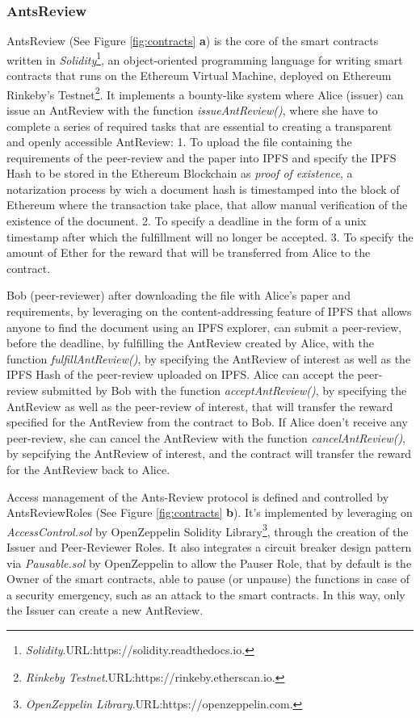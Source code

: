 \documentclass[runningheads]{llncs}
\begin{document}
\subsubsection{AntsReview}
AntsReview (See Figure \ref{fig:contracts} \textbf{a}) is the core of the smart contracts written in \emph{Solidity}\footnote[6]{\emph{Solidity}.\textsc{URL:}https://solidity.readthedocs.io.}, an object-oriented programming language for writing smart contracts that runs on the Ethereum Virtual Machine, deployed on Ethereum Rinkeby's Testnet\footnote[7]{\emph{Rinkeby Testnet}.\textsc{URL:}https://rinkeby.etherscan.io.}. It implements a bounty-like system where Alice (issuer) can issue an AntReview with the function \emph{issueAntReview()}, where she have to complete a series of required tasks that are essential to creating a transparent and openly accessible AntReview:
 1. To upload the file containing the requirements of the peer-review and the paper into IPFS\cite{IPFS} and specify the IPFS Hash to be stored in the Ethereum Blockchain as \emph{proof of existence}, a notarization process by wich a document hash is timestamped into the block of Ethereum where the transaction take place, that allow manual verification of the existence of the document.
 2. To specify a deadline in the form of a unix timestamp after which the fulfillment will no longer be accepted.
 3. To specify the amount of Ether for the reward that will be transferred from Alice to the contract.

Bob (peer-reviewer) after downloading the file with Alice's paper and requirements, by leveraging on the content-addressing feature of IPFS that allows anyone to find the document using an IPFS explorer, can submit a peer-review, before the deadline, by fulfilling the AntReview created by Alice, with the function \emph{fulfillAntReview()}, by specifying the AntReview of interest as well as the IPFS Hash of the peer-review uploaded on IPFS.
Alice can accept the peer-review submitted by Bob with the function \emph{acceptAntReview()}, by specifying the AntReview as well as the peer-review of interest, that will transfer the reward specified for the AntReview from the contract to Bob.
If Alice doen't receive any peer-review, she can cancel the AntReview with the function \emph{cancelAntReview()}, by sepcifying the AntReview of interest, and the contract will transfer the reward for the AntReview back to Alice.

Access management of the Ants-Review protocol is defined and controlled by AntsReviewRoles (See Figure \ref{fig:contracts} \textbf{b}). It's implemented by leveraging on \emph{AccessControl.sol} by OpenZeppelin Solidity Library\footnote[8]{\emph{OpenZeppelin Library}.\textsc{URL:}https://openzeppelin.com.}, through the creation of the Issuer and Peer-Reviewer Roles.
\newline It also integrates a circuit breaker design pattern via \emph{Pausable.sol} by OpenZeppelin to allow the Pauser Role, that by default is the Owner of the smart contracts, able to pause (or unpause) the functions in case of a security emergency, such as an attack to the smart contracts. In this way, only the Issuer can create a new AntReview.
\end{document}
